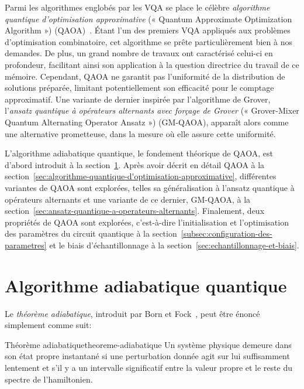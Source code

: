 Parmi les algorithmes englobés par les VQA se place le célèbre \textit{algorithme quantique d'optimisation approximative} (« Quantum Approximate Optimization Algorithm ») (QAOA)~\cite{farhiQuantumApproximateOptimization2014}. Étant l'un des premiers VQA appliqués aux problèmes d'optimisation combinatoire, cet algorithme se prête particulièrement bien à nos demandes. De plus, un grand nombre de travaux ont caractérisé celui-ci en profondeur, facilitant ainsi son application à la question directrice du travail de ce mémoire. Cependant, QAOA ne garantit pas l'uniformité de la distribution de solutions préparée, limitant potentiellement son efficacité pour le comptage approximatif. Une variante de dernier inspirée par l'algorithme de Grover, l'\textit{ansatz quantique à opérateurs alternants avec forçage de Grover} (« Grover-Mixer Quantum Alternating Operator Ansatz ») (GM-QAOA), apparaît alors comme une alternative prometteuse, dans la mesure où elle assure cette uniformité.

L'algorithme adiabatique quantique, le fondement théorique de QAOA, est d'abord introduit à la section~\ref{sec:algorithme-adiabatique-quantique}. Après avoir décrit en détail QAOA à la section~\ref{sec:algorithme-quantique-d'optimisation-approximative}, différentes variantes de QAOA sont explorées, telles sa généralisation à l'ansatz quantique à opérateurs alternants et une variante de ce dernier, GM-QAOA, à la section~\ref{sec:ansatz-quantique-a-operateurs-alternants}. Finalement, deux propriétés de QAOA sont explorées, c'est-à-dire l'initialisation et l'optimisation des paramètres du circuit quantique à la section~\ref{subsec:configuration-des-parametres} et le biais d'échantillonnage à la section~\ref{sec:echantillonnage-et-biais}.


\section{Algorithme adiabatique quantique}
\label{sec:algorithme-adiabatique-quantique}

Le \textit{théorème adiabatique}, introduit par Born et Fock~\cite{bornBeweisAdiabatensatzes1928}, peut être énoncé simplement comme suit:

\begin{subtheorem}{Théorème adiabatique}{theoreme-adiabatique}
    Un système physique demeure dans son état propre instantané si une perturbation donnée agit sur lui suffisamment lentement et s'il y a un intervalle significatif entre la valeur propre et le reste du spectre de l'hamiltonien.
\end{subtheorem}

